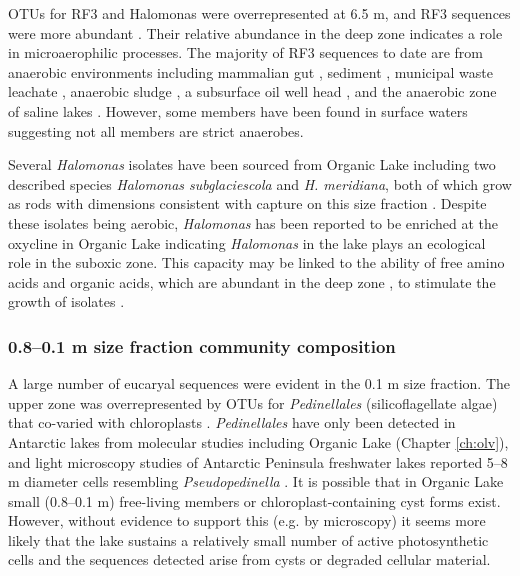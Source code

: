 \acp{OTU} for RF3 and Halomonas were overrepresented at 6.5 m, and RF3 sequences were more abundant . 
Their relative abundance in the deep zone indicates a role in microaerophilic processes. 
The majority of RF3 sequences to date are from anaerobic environments including mammalian gut \cite{Tajima1999, Ley2006, Samsudin2011}, sediment \cite{Yanagibayashi1999, Roske2012}, municipal waste leachate \cite{Huang2005}, anaerobic sludge \cite{Chouari2005, Goberna2009, Riviere2009, Tang2011}, a subsurface oil well head \cite{Yamane2011}, and the anaerobic zone of saline lakes \cite{Humayoun2003, Schmidtova2009, Bowman2000a}. 
However, some members have been found in surface waters \cite{Demergasso2008, Xing2009, Yilmaz2012} suggesting not all members are strict anaerobes. 

Several \emph{Halomonas} isolates have been sourced from Organic Lake including two described species \emph{Halomonas subglaciescola} and \emph{H. meridiana}, both of which grow as rods with dimensions consistent with capture on this size fraction \cite{Franzmann1987a, James1990}. 
Despite these isolates being aerobic, \emph{Halomonas} has been reported to be enriched at the oxycline in Organic Lake \cite{James1994} indicating \emph{Halomonas} in the lake plays an ecological role in the suboxic zone. 
This capacity may be linked to the ability of free amino acids and organic acids, which are abundant in the deep zone \cite{Gibson1994}, to stimulate the growth of isolates \cite{Franzmann1987a}.

\subsubsection{0.8--0.1 \textmu{}m size fraction community composition}
A large number of eucaryal sequences were evident in the 0.1 \textmu{}m size fraction. 
The upper zone was overrepresented by \acp{OTU} for \emph{Pedinellales} (silicoflagellate algae) that co-varied with chloroplasts . 
\emph{Pedinellales} have only been detected in Antarctic lakes from molecular studies \cite{Unrein2005, Lauro2011} including Organic Lake \cite{Yau2011} (Chapter \ref{ch:olv}), and light microscopy studies of Antarctic Peninsula freshwater lakes reported 5--8 \textmu{}m diameter cells resembling \emph{Pseudopedinella} \cite{Unrein2005}. 
It is possible that in Organic Lake small (0.8–0.1 \textmu{}m) free-living members or chloroplast-containing cyst forms \cite{Thomsen1988} exist. 
However, without evidence to support this (e.g. by microscopy) it seems more likely that the lake sustains a relatively small number of active photosynthetic cells and the sequences detected arise from cysts or degraded cellular material.

